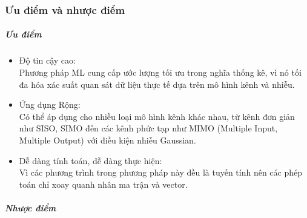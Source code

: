 \documentclass{article}
\begin{document}
\subsubsection{Ưu điểm và nhược điểm}
\subparagraph{Ưu điểm}

\begin{itemize}
    \item {Độ tin cậy cao:}\\ Phương pháp ML cung cấp ước lượng tối ưu trong nghĩa thống kê, vì nó tối đa hóa xác suất quan sát dữ liệu thực tế dựa trên mô hình kênh và nhiễu.
    \item {Ứng dụng Rộng:}\\ Có thể áp dụng cho nhiều loại mô hình kênh khác nhau, từ kênh đơn giản như SISO, SIMO đến các kênh phức tạp như MIMO (Multiple Input, Multiple Output) với điều kiện nhiễu Gaussian.
    \item Dễ dàng tính toán, dễ dàng thực hiện:\\ Vì các phương trình trong phương pháp này đều là tuyến tính nên các phép toán chỉ xoay quanh nhân ma trận và vector.
\end{itemize}

\subparagraph{Nhược điểm}
\end{document}
